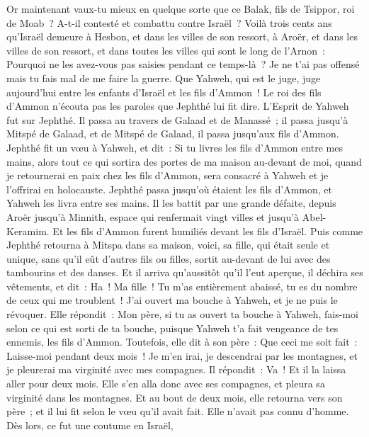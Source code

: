 \begin{multicols}{2}
Or maintenant vaux-tu mieux en quelque sorte que ce Balak, fils de Tsippor, roi de Moab~? A-t-il contesté et combattu contre Israël~?
Voilà trois cents ans qu'Israël demeure à Hesbon, et dans les villes de son ressort, à Aroër, et dans les villes de son ressort, et dans toutes les villes qui sont le long de l'Arnon~: Pourquoi ne les avez-vous pas saisies pendant ce temps-là~?
Je ne t'ai pas offensé mais tu fais mal de me faire la guerre. Que Yahweh, qui est le juge, juge aujourd'hui entre les enfants d'Israël et les fils d'Ammon~!
Le roi des fils d'Ammon n'écouta pas les paroles que Jephthé lui fit dire.
L'Esprit de Yahweh fut sur Jephthé. Il passa au travers de Galaad et de Manassé~; il passa jusqu'à Mitspé de Galaad, et de Mitspé de Galaad, il passa jusqu'aux fils d'Ammon.
Jephthé fit un vœu à Yahweh, et dit~: Si tu livres les fils d'Ammon entre mes mains,
alors tout ce qui sortira des portes de ma maison au-devant de moi, quand je retournerai en paix chez les fils d'Ammon, sera consacré à Yahweh et je l'offrirai en holocauste.
Jephthé passa jusqu'où étaient les fils d'Ammon, et Yahweh les livra entre ses mains.
Il les battit par une grande défaite, depuis Aroër jusqu'à Minnith, espace qui renfermait vingt villes et jusqu'à Abel-Keramim. Et les fils d'Ammon furent humiliés devant les fils d'Israël.
Puis comme Jephthé retourna à Mitspa dans sa maison, voici, sa fille, qui était seule et unique, sans qu'il eût d'autres fils ou filles, sortit au-devant de lui avec des tambourins et des danses.
Et il arriva qu'aussitôt qu'il l'eut aperçue, il déchira ses vêtements, et dit~: Ha~! Ma fille~! Tu m'as entièrement abaissé, tu es du nombre de ceux qui me troublent~! J'ai ouvert ma bouche à Yahweh, et je ne puis le révoquer.
Elle répondit~: Mon père, si tu as ouvert ta bouche à Yahweh, fais-moi selon ce qui est sorti de ta bouche, puisque Yahweh t'a fait vengeance de tes ennemis, les fils d'Ammon.
Toutefois, elle dit à son père~: Que ceci me soit fait~: Laisse-moi pendant deux mois~! Je m'en irai, je descendrai par les montagnes, et je pleurerai ma virginité avec mes compagnes.
Il répondit~: Va~! Et il la laissa aller pour deux mois. Elle s'en alla donc avec ses compagnes, et pleura sa virginité dans les montagnes.
Et au bout de deux mois, elle retourna vers son père~; et il lui fit selon le vœu qu'il avait fait. Elle n'avait pas connu d'homme. Dès lors, ce fut une coutume en Israël,

\end{multicols}
